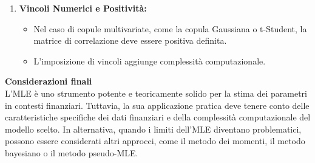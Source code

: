 \documentclass[a4paper,12pt]{article}
\begin{document}
\begin{itemize}
\begin{enumerate}[label=\arabic*.]
		\item \textbf{Vincoli Numerici e Positività:}
		\begin{itemize}
			\item Nel caso di copule multivariate, come la copula Gaussiana o t-Student, la matrice di correlazione deve essere positiva definita. 
			\item L'imposizione di vincoli aggiunge complessità computazionale.
		\end{itemize}
	\end{enumerate}
	\textbf{Considerazioni finali}\\
	L'MLE è uno strumento potente e teoricamente solido per la stima dei parametri in contesti finanziari. Tuttavia, la sua applicazione pratica deve tenere conto delle caratteristiche specifiche dei dati finanziari e della complessità computazionale del modello scelto. In alternativa, quando i limiti dell'MLE diventano problematici, possono essere considerati altri approcci, come il metodo dei momenti, il metodo bayesiano o il metodo pseudo-MLE.
\end{itemize}
\end{document}
